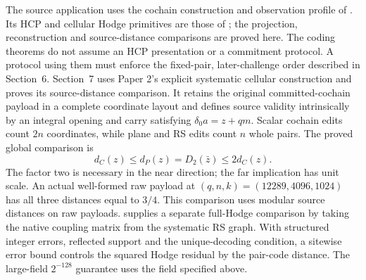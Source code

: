 The source application uses the cochain construction and observation profile
of \cite{vanDerVlugt2026protocol}. Its HCP and cellular Hodge primitives
are those of \cite{vanDerVlugt2026hcp}; the projection, reconstruction
and source-distance comparisons are proved here.
The coding theorems do not assume an HCP presentation or a commitment
protocol. A protocol using them must enforce the fixed-pair, later-challenge
order described in Section~6. Section~7 uses Paper 2's explicit systematic
cellular construction and proves its source-distance comparison. It retains
the original committed-cochain payload in a complete coordinate
layout and defines source validity intrinsically by an integral opening and
carry satisfying \(\delta_0a=z+qm\). Scalar cochain edits count \(2n\)
coordinates, while plane and RS edits count \(n\) whole pairs. The proved
global comparison is
\[
  d_C(z)\le d_P(z)=D_2(\bar z)\le2d_C(z).
\]
The factor two is necessary in the near direction; the far implication has
unit scale. An actual well-formed raw payload at
\((q,n,k)=(12289,4096,1024)\) has all three distances equal to \(3/4\).
This comparison uses modular source distances on raw payloads.
 supplies a separate full-Hodge comparison
by taking the native coupling matrix from the systematic RS graph.
With structured integer errors, reflected support and the unique-decoding
condition, a sitewise error bound controls the squared Hodge residual by the
pair-code distance. The large-field \(2^{-128}\) guarantee uses the field
specified above.

